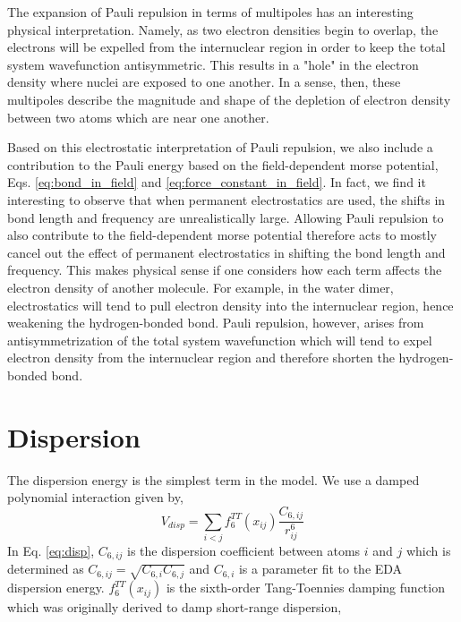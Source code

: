 \documentclass[journal=jacsat,manuscript=article]{achemso}
\begin{document}
The expansion of Pauli repulsion in terms of multipoles has an interesting physical interpretation.
Namely, as two electron densities begin to overlap, the electrons will be expelled
from the internuclear region in order to keep the total system wavefunction antisymmetric.
This results in a "hole" in the electron density where nuclei are exposed to one another.
In a sense, then, these multipoles describe the magnitude and shape of the depletion of electron density
between two atoms which are near one another.

Based on this electrostatic interpretation of Pauli repulsion, we also include a contribution
to the Pauli energy based on the field-dependent morse potential, Eqs. \ref{eq:bond_in_field} and \ref{eq:force_constant_in_field}.
In fact, we find it interesting to observe that when permanent electrostatics are used, the shifts
in bond length and frequency are unrealistically large. Allowing Pauli repulsion to also contribute
to the field-dependent morse potential therefore acts to mostly cancel out the effect of permanent
electrostatics in shifting the bond length and frequency. This makes physical sense if one considers
how each term affects the electron density of another molecule. For example, in the water dimer, electrostatics
will tend to pull electron density into the internuclear region, hence weakening the hydrogen-bonded 
bond. Pauli repulsion, however, arises from antisymmetrization of the total system wavefunction which
will tend to expel electron density from the internuclear region and therefore shorten the hydrogen-bonded  bond.

\section*{Dispersion}

The dispersion energy is the simplest term in the model. We use a damped
polynomial interaction given by,
\begin{equation}
  V_{disp}=\sum_{i<j}f_6^{TT}(x_{ij})\frac{C_{6,ij}}{r_{ij}^6}
  \label{eq:disp}
\end{equation}
\noindent
In Eq. \ref{eq:disp}, $C_{6,ij}$ is the dispersion coefficient between atoms
$i$ and $j$ which is determined as $C_{6,ij}=\sqrt{C_{6,i}C_{6,j}}$ and $C_{6,i}$ is
a parameter fit to the EDA dispersion energy. $f_6^{TT}(x_{ij})$ is the sixth-order
Tang-Toennies damping function\cite{tang1984improved} which was originally derived
to damp short-range dispersion,
\end{document}
